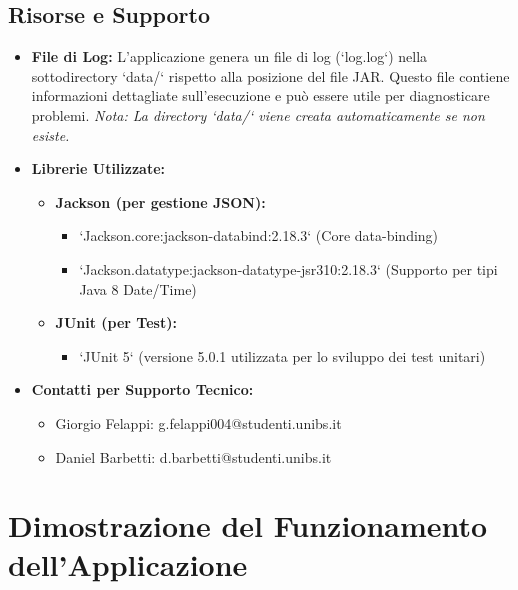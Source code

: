 \documentclass[a4paper,12pt]{article}
\begin{document}
    \subsection{Risorse e Supporto}
    \begin{itemize}
        \item \textbf{File di Log:} L'applicazione genera un file di log (`log.log`) nella sottodirectory `data/` rispetto alla posizione del file JAR. Questo file contiene informazioni dettagliate sull'esecuzione e può essere utile per diagnosticare problemi. \textit{Nota: La directory `data/` viene creata automaticamente se non esiste.}

        \item \textbf{Librerie Utilizzate:}
        \begin{itemize}
            \item \textbf{Jackson (per gestione JSON):}
            \begin{itemize}
                \item `Jackson.core:jackson-databind:2.18.3` (Core data-binding)
                \item `Jackson.datatype:jackson-datatype-jsr310:2.18.3` (Supporto per tipi Java 8 Date/Time)
            \end{itemize}
            \item \textbf{JUnit (per Test):}
            \begin{itemize}
                \item `JUnit 5` (versione 5.0.1 utilizzata per lo sviluppo dei test unitari)
            \end{itemize}
        \end{itemize}

        \item \textbf{Contatti per Supporto Tecnico:}
        \begin{itemize}
            \item Giorgio Felappi: g.felappi004@studenti.unibs.it
            \item Daniel Barbetti: d.barbetti@studenti.unibs.it
        \end{itemize}
    \end{itemize}

    \newpage


    \section{Dimostrazione del Funzionamento dell'Applicazione}
\end{document}
